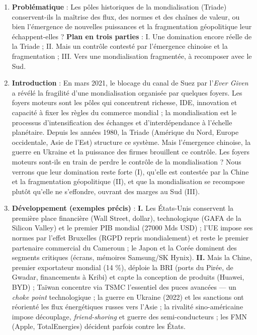 \documentclass[11pt]{article}
\newcommand{\cle}[1]{{\popxbold\color{popdark}#1}}
\begin{document}
\begin{corrige}
\begin{enumerate}
\item \textbf{Problématique} : Les pôles historiques de la mondialisation (Triade) conservent-ils la maîtrise des flux, des normes et des chaînes de valeur, ou bien l'émergence de nouvelles puissances et la fragmentation géopolitique leur échappent-elles ? \textbf{Plan en trois parties} : I. Une domination encore réelle de la Triade ; II. Mais un contrôle contesté par l'émergence chinoise et la fragmentation ; III. Vers une mondialisation fragmentée, à recomposer avec le Sud.
\item \textbf{Introduction} : En mars 2021, le blocage du canal de Suez par l'\emph{Ever Given} a révélé la fragilité d'une mondialisation organisée par quelques foyers. Les foyers moteurs sont les pôles qui concentrent richesse, IDE, innovation et capacité à fixer les règles du commerce mondial ; la mondialisation est le processus d'intensification des échanges et d'interdépendance à l'échelle planétaire. Depuis les années 1980, la Triade (Amérique du Nord, Europe occidentale, Asie de l'Est) structure ce système. Mais l'émergence chinoise, la guerre en Ukraine et la puissance des firmes brouillent ce contrôle. Les foyers moteurs sont-ils en train de perdre le contrôle de la mondialisation ? Nous verrons que leur domination reste forte (I), qu'elle est contestée par la Chine et la fragmentation géopolitique (II), et que la mondialisation se recompose plutôt qu'elle ne s'effondre, ouvrant des marges au Sud (III).
\item \textbf{Développement (exemples précis)} :
\textbf{I.} Les États-Unis conservent la première place financière (Wall Street, dollar), technologique (GAFA de la Silicon Valley) et le premier PIB mondial (\num{27000} Mds USD) ; l'UE impose ses normes par l'\cle{effet Bruxelles} (RGPD repris mondialement) et reste le premier partenaire commercial du Cameroun ; le Japon et la Corée dominent des segments critiques (écrans, mémoires Samsung/SK Hynix).
\textbf{II.} Mais la Chine, premier exportateur mondial (14 \%), déploie la \cle{BRI} (ports du Pirée, de Gwadar, financements à Kribi) et capte la conception de produits (Huawei, BYD) ; Taïwan concentre via TSMC l'essentiel des puces avancées — un \emph{choke point} technologique ; la guerre en Ukraine (2022) et les sanctions ont réorienté les flux énergétiques russes vers l'Asie ; la rivalité sino-américaine impose découplage, \emph{friend-shoring} et guerre des semi-conducteurs ; les FMN (Apple, TotalEnergies) décident parfois contre les États.

\end{enumerate}
\end{corrige}
\end{document}
